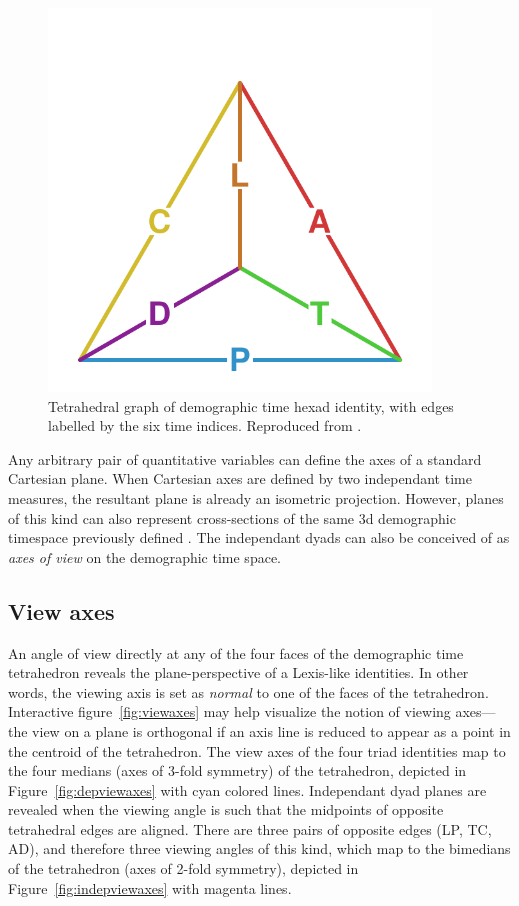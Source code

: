 \begin{figure}[h!]
\centering
\caption{Tetrahedral graph of demographic time hexad identity, with edges
labelled by the six time indices. Reproduced from 
\citet{riffe2017demographictime}.}
\label{fig:tet}
\includegraphics[width=4in]{Figures/TetraHedronEdgesOnly.pdf}%
\end{figure}

Any arbitrary pair of quantitative variables can define the axes of a standard Cartesian plane. When
Cartesian axes are defined by two independant time measures, the resultant plane
is already an isometric projection. However, planes of this kind can also
represent cross-sections of the same 3d demographic timespace previously defined \citep{riffe2017demographictime}.
The independant dyads can also be conceived of as \emph{axes of view} on the
demographic time space.

\subsection{View axes}
An angle of view directly at any of the four faces of the demographic
time tetrahedron reveals the plane-perspective of a
Lexis-like identities. In other words, the viewing axis is set as
\emph{normal} to one of the faces of the tetrahedron. Interactive
figure~\ref{fig:viewaxes} may help visualize the notion of viewing axes--- the
view on a plane is orthogonal if an axis line is reduced to appear as a point in
the centroid of the tetrahedron. The view axes of the four triad identities map
to the four medians (axes of 3-fold symmetry) of the tetrahedron, depicted in
Figure~\ref{fig:depviewaxes} with cyan colored lines.
Independant dyad planes are revealed when the viewing angle is such that the midpoints of opposite tetrahedral edges are aligned. There are three pairs of
opposite edges (LP, TC, AD), and therefore three viewing angles of this kind,
which map to the bimedians of the tetrahedron (axes of 2-fold symmetry),
depicted in Figure~\ref{fig:indepviewaxes} with magenta lines.

